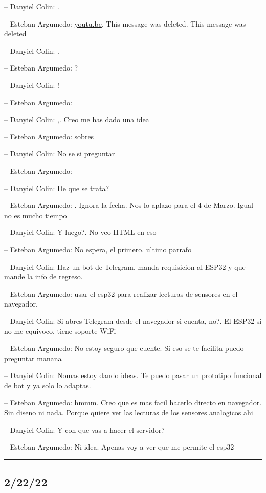 -- Danyiel Colin: .

-- Esteban Argumedo: \href{https://youtu.be/klmBTGQUkbM}{youtu.be}. This
message was deleted. This message was deleted

-- Danyiel Colin: .

-- Esteban Argumedo: ?

-- Danyiel Colin: !

-- Esteban Argumedo:

-- Danyiel Colin: ,. Creo me has dado una idea

-- Esteban Argumedo: sobres

-- Danyiel Colin: No se si preguntar

-- Esteban Argumedo:

-- Danyiel Colin: De que se trata?

-- Esteban Argumedo: . Ignora la fecha. Nos lo aplazo para el 4 de
Marzo. Igual no es mucho tiempo

-- Danyiel Colin: Y luego?. No veo HTML en eso

-- Esteban Argumedo: No espera, el primero. ultimo parrafo

-- Danyiel Colin: Haz un bot de Telegram, manda requisicion al ESP32 y
que mande la info de regreso.

-- Esteban Argumedo: usar el esp32 para realizar lecturas de sensores en
el navegador.

-- Danyiel Colin: Si abres Telegram desde el navegador si cuenta, no?.
El ESP32 si no me equivoco, tiene soporte WiFi

-- Esteban Argumedo: No estoy seguro que cuente. Si eso se te facilita
puedo preguntar manana

-- Danyiel Colin: Nomas estoy dando ideas. Te puedo pasar un prototipo
funcional de bot y ya solo lo adaptas.

-- Esteban Argumedo: hmmm. Creo que es mas facil hacerlo directo en
navegador. Sin diseno ni nada. Porque quiere ver las lecturas de los
sensores analogicos ahi

-- Danyiel Colin: Y con que vas a hacer el servidor?

-- Esteban Argumedo: Ni idea. Apenas voy a ver que me permite el esp32

\begin{center}\rule{0.5\linewidth}{0.5pt}\end{center}

\hypertarget{section-14}{%
\subsection{2/22/22}\label{section-14}}

